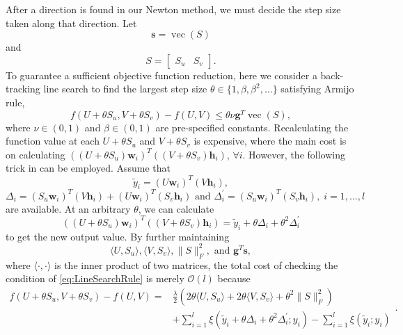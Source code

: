 \documentclass[11pt,twoside]{article}
\newcommand{\bsym}[1]{\ensuremath{\boldsymbol{#1}}}
\newcommand{\bw}{\ensuremath{\bsym{w}}}
\newcommand{\bh}{\ensuremath{\bsym{h}}}
\newcommand{\bs}{\ensuremath{\bsym{s}}}
\newcommand{\bg}{\ensuremath{\bsym{g}}}
\newcommand{\bbO}[1]{\ensuremath{\mathcal{O}\left(#1\right)}}
\DeclareMathOperator*{\vectorize}{vec}
\begin{document}
After a direction is found in our Newton method, we must decide the step size taken along that direction. 
Let 
\begin{equation}
\bs = \vectorize(S)
\label{eq:s}
\end{equation} 
and 
\begin{equation}
S = \begin{bmatrix} S_u & S_v \end{bmatrix}
\label{eq:susv}.
\end{equation}  
To guarantee a sufficient objective function reduction, here we consider a back-tracking line search to find the largest step size $\theta\in\{1,\beta,\beta^2,\dots\}$ satisfying Armijo rule,
\begin{equation}
    f(U+\theta S_{u},V+\theta S_{v}) - f(U,V) \le \theta\nu {\bg}^T\vectorize(S),
    \label{eq:LineSearchRule}
\end{equation}
where $\nu\in(0,1)$ and $\beta\in(0,1)$ are pre-specified constants.
Recalculating the function value at each $U+\theta S_{u}$ and $V+\theta S_{v}$ is expensive, where the main cost is on calculating $((U+\theta S_{u})\bw_i)^T((V+\theta S_{v})\bh_i)$, $\forall i$.
However, the following trick in \cite{GXY09a} can be employed.
Assume that
\begin{equation}
    \tilde{y}_i = (U\bw_i)^T(V\bh_i) 
    \label{eq:predicted_y},
\end{equation}
\begin{equation}
    {\Delta}_i=(S_u\bw_i)^T(V\bh_i)+(U\bw_i)^T(S_v\bh_i)\text{ and }{\Delta}_i^\prime = (S_u\bw_i)^T(S_v\bh_i),\; i=1,\dots,l    
    \label{eq:LsRequire}
\end{equation}
are available.
At an arbitrary $\theta$, we can calculate
\begin{equation}
    \left((U+\theta S_u)\bw_i\right)^T\left((V+\theta S_v)\bh_i\right) = \tilde{y}_i + \theta{\Delta}_i + {\theta}^2{\Delta}_i^\prime    
    \label{eq:ExpTheta}
\end{equation}
to get the new output value.
By further maintaining
\begin{equation}    
    \langle{U}{,}{S_u}\rangle,\langle{V}{,}{S_v}\rangle,\|S\|_F^2,\text{ and } {\bg}^T{\bs},
    \label{eq:LsRequire1}
\end{equation}
where $\langle\cdot{,}\cdot\rangle$ is the inner product of two matrices, the total cost of checking the condition of \eqref{eq:LineSearchRule} is merely $\bbO{l}$ because
\begin{equation}
    \begin{aligned}
        f(U+\theta S_{u},V+\theta S_{v}) - f(U,V) =& \frac{\lambda}{2}\left( 2\theta \langle{U}{,}{S_u}\rangle + 2\theta \langle{V}{,}{S_v}\rangle + \theta^2\|S\|_F^2 \right)\\ 
        &+ \sum_{i=1}^l \xi(\tilde{y}_i + \theta{\Delta}_i + {\theta}^2{\Delta}_i^\prime;y_i) -\sum_{i=1}^l \xi(\tilde{y}_i;y_i)        
    \end{aligned}
    \label{eq:LrObjFast}.
\end{equation}
\end{document}
